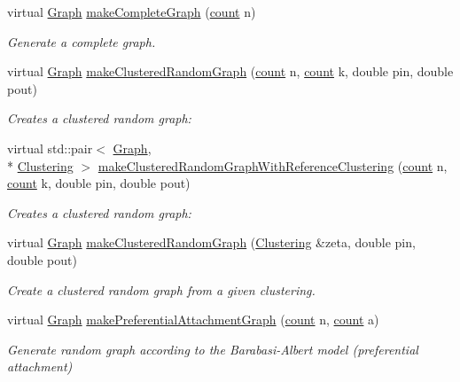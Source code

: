 \begin{DoxyCompactItemize}
virtual \hyperlink{class_networ_kit_1_1_graph}{Graph} \hyperlink{class_networ_kit_1_1_graph_generator_a8dcd5d1f75f5f04d1cbf98dd60616f31}{make\-Complete\-Graph} (\hyperlink{namespace_networ_kit_ad4c536a5339a8bf2f91f418b9a67a7d8}{count} n)
\begin{DoxyCompactList}\small\item\em Generate a complete graph. \end{DoxyCompactList}\item 
virtual \hyperlink{class_networ_kit_1_1_graph}{Graph} \hyperlink{class_networ_kit_1_1_graph_generator_ace5f942042a6805eb8cad512376ec641}{make\-Clustered\-Random\-Graph} (\hyperlink{namespace_networ_kit_ad4c536a5339a8bf2f91f418b9a67a7d8}{count} n, \hyperlink{namespace_networ_kit_ad4c536a5339a8bf2f91f418b9a67a7d8}{count} k, double pin, double pout)
\begin{DoxyCompactList}\small\item\em Creates a clustered random graph\-: \end{DoxyCompactList}\item 
virtual std\-::pair$<$ \hyperlink{class_networ_kit_1_1_graph}{Graph}, \\*
\hyperlink{class_networ_kit_1_1_clustering}{Clustering} $>$ \hyperlink{class_networ_kit_1_1_graph_generator_a51347c6d014f63a0ad0807ba7f96a6be}{make\-Clustered\-Random\-Graph\-With\-Reference\-Clustering} (\hyperlink{namespace_networ_kit_ad4c536a5339a8bf2f91f418b9a67a7d8}{count} n, \hyperlink{namespace_networ_kit_ad4c536a5339a8bf2f91f418b9a67a7d8}{count} k, double pin, double pout)
\begin{DoxyCompactList}\small\item\em Creates a clustered random graph\-: \end{DoxyCompactList}\item 
virtual \hyperlink{class_networ_kit_1_1_graph}{Graph} \hyperlink{class_networ_kit_1_1_graph_generator_a6c66c5379190e4544018a61950abdb15}{make\-Clustered\-Random\-Graph} (\hyperlink{class_networ_kit_1_1_clustering}{Clustering} \&zeta, double pin, double pout)
\begin{DoxyCompactList}\small\item\em Create a clustered random graph from a given clustering. \end{DoxyCompactList}\item 
virtual \hyperlink{class_networ_kit_1_1_graph}{Graph} \hyperlink{class_networ_kit_1_1_graph_generator_a9fe96a183dd8177fccdc69ac1a9b930b}{make\-Preferential\-Attachment\-Graph} (\hyperlink{namespace_networ_kit_ad4c536a5339a8bf2f91f418b9a67a7d8}{count} n, \hyperlink{namespace_networ_kit_ad4c536a5339a8bf2f91f418b9a67a7d8}{count} a)
\begin{DoxyCompactList}\small\item\em Generate random graph according to the Barabasi-\/\-Albert model (preferential attachment) \end{DoxyCompactList}\end{DoxyCompactItemize}


